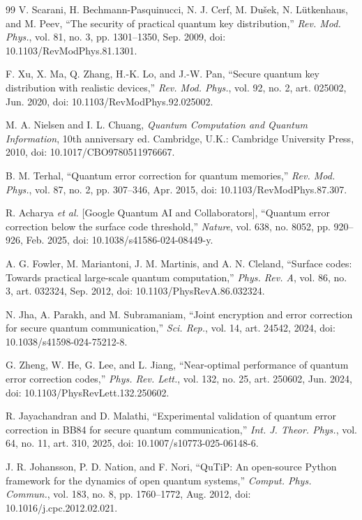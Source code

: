 \documentclass[conference]{IEEEtran}
\begin{document}
\begin{thebibliography}{99}
 V. Scarani, H. Bechmann-Pasquinucci, N. J. Cerf, M.
Du\v{s}ek, N. L\"utkenhaus, and M. Peev, ``The security of practical quantum key
distribution,'' \emph{Rev. Mod. Phys.}, vol. 81, no. 3, pp. 1301--1350, Sep.
2009, doi: 10.1103/RevModPhys.81.1301.

 F. Xu, X. Ma, Q. Zhang, H.-K. Lo, and J.-W. Pan, ``Secure
quantum key distribution with realistic devices,'' \emph{Rev. Mod. Phys.}, vol.
92, no. 2, art. 025002, Jun. 2020, doi: 10.1103/RevModPhys.92.025002.

 M. A. Nielsen and I. L. Chuang, \emph{Quantum Computation
and Quantum Information}, 10th anniversary ed. Cambridge, U.K.: Cambridge
University Press, 2010, doi: 10.1017/CBO9780511976667.

 B. M. Terhal, ``Quantum error correction for quantum
memories,'' \emph{Rev. Mod. Phys.}, vol. 87, no. 2, pp. 307--346, Apr. 2015,
doi: 10.1103/RevModPhys.87.307.

 R. Acharya \emph{et al.} [Google Quantum AI and
Collaborators], ``Quantum error correction below the surface code threshold,''
\emph{Nature}, vol. 638, no. 8052, pp. 920--926, Feb. 2025, doi:
10.1038/s41586-024-08449-y.

 A. G. Fowler, M. Mariantoni, J. M. Martinis, and A. N.
Cleland, ``Surface codes: Towards practical large-scale quantum computation,''
\emph{Phys. Rev. A}, vol. 86, no. 3, art. 032324, Sep. 2012, doi:
10.1103/PhysRevA.86.032324.

 N. Jha, A. Parakh, and M. Subramaniam, ``Joint encryption and
error correction for secure quantum communication,'' \emph{Sci. Rep.}, vol. 14,
art. 24542, 2024, doi: 10.1038/s41598-024-75212-8.

 G. Zheng, W. He, G. Lee, and L. Jiang, ``Near-optimal
performance of quantum error correction codes,'' \emph{Phys. Rev. Lett.}, vol.
132, no. 25, art. 250602, Jun. 2024, doi: 10.1103/PhysRevLett.132.250602.

 R. Jayachandran and D. Malathi, ``Experimental
validation of quantum error correction in BB84 for secure quantum
communication,'' \emph{Int. J. Theor. Phys.}, vol. 64, no. 11, art. 310, 2025,
doi: 10.1007/s10773-025-06148-6.

 J. R. Johansson, P. D. Nation, and F. Nori, ``QuTiP: An
open-source Python framework for the dynamics of open quantum systems,''
\emph{Comput. Phys. Commun.}, vol. 183, no. 8, pp. 1760--1772, Aug. 2012, doi:
10.1016/j.cpc.2012.02.021.

\end{thebibliography}
\end{document}
